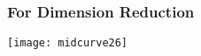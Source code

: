 \begin{frame}[fragile]\frametitle{For Dimension Reduction}
\begin{center}
\texttt{[image: midcurve26]}
\end{center}	
\end{frame}

